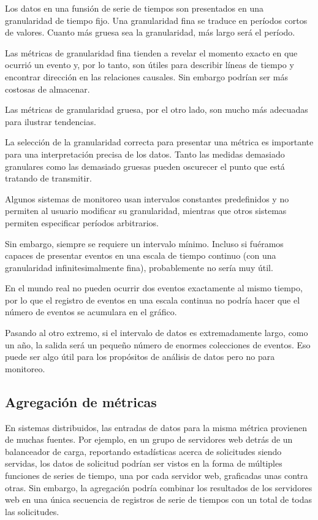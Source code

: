 Los datos en una funsión de serie de tiempos son presentados en una
granularidad de tiempo fijo. Una granularidad fina se traduce en períodos
cortos de valores. Cuanto más gruesa sea la granularidad, más largo será el
período.

Las métricas de granularidad fina tienden a revelar el momento exacto en que
ocurrió un evento y, por lo tanto, son útiles para describir líneas de tiempo y
encontrar dirección en las relaciones causales. Sin embargo podrían ser más
costosas de almacenar.

Las métricas de granularidad gruesa, por el otro lado, son mucho más adecuadas
para ilustrar tendencias.

La selección de la granularidad correcta para presentar una métrica es
importante para una interpretación precisa de los datos. Tanto las medidas
demasiado granulares como las demasiado gruesas pueden oscurecer el punto que
está tratando de transmitir.

Algunos sistemas de monitoreo usan intervalos constantes predefinidos y no
permiten al usuario modificar su granularidad, mientras que otros sistemas
permiten especificar períodos arbitrarios.

Sin embargo, siempre se requiere un intervalo mínimo. Incluso si fuéramos
capaces de presentar eventos en una escala de tiempo continuo (con una
granularidad infinitesimalmente fina), probablemente no sería muy útil.

En el mundo real no pueden ocurrir dos eventos exactamente al mismo tiempo, por
lo que el registro de eventos en una escala continua no podría hacer que el
número de eventos se acumulara en el gráfico.

Pasando al otro extremo, si el intervalo de datos es extremadamente largo, como
un año, la salida será un pequeño número de enormes colecciones de eventos. Eso
puede ser algo útil para los propósitos de análisis de datos pero no para
monitoreo.

\subsection*{Agregación de métricas}
\label{agregacion_de_metricas}

En sistemas distribuidos, las entradas de datos para la misma métrica provienen
de muchas fuentes. Por ejemplo, en un grupo de servidores web detrás de un
balanceador de carga, reportando estadísticas acerca de solicitudes siendo
servidas, los datos de solicitud podrían ser vistos en la forma de múltiples
funciones de series de tiempo, una por cada servidor web, graficadas unas
contra otras. Sin embargo, la agregación podría combinar los resultados de los
servidores web en una única secuencia de registros de serie de tiempos con un
total de todas las solicitudes.


